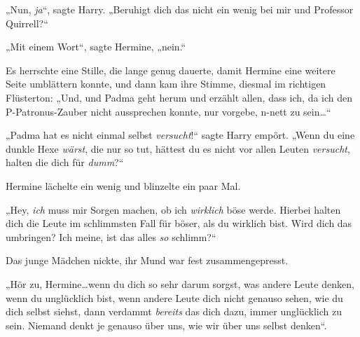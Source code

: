 „Nun, \emph{ja}“, sagte Harry.
„Beruhigt dich das nicht ein wenig bei mir und Professor Quirrell?“

„Mit einem Wort“, sagte Hermine, „nein.“

Es herrschte eine Stille, die lange genug dauerte, damit Hermine eine weitere Seite umblättern konnte, und dann kam ihre Stimme, diesmal im richtigen Flüsterton:
„Und, und Padma geht herum und erzählt allen, dass ich, da ich den P-Patronus-Zauber nicht aussprechen konnte, nur vorgebe, n-nett zu sein…“

„Padma hat es nicht einmal selbst \emph{versucht}!“ sagte Harry empört.
„Wenn du eine dunkle Hexe \emph{wärst}, die nur so tut, hättest du es nicht vor allen Leuten \emph{versucht}, halten die dich für \emph{dumm}?“

Hermine lächelte ein wenig und blinzelte ein paar Mal.

„Hey, \emph{ich} muss mir Sorgen machen, ob ich \emph{wirklich} böse werde. Hierbei halten dich die Leute im schlimmsten Fall für böser, als du wirklich bist. Wird dich das umbringen? Ich meine, ist das alles \emph{so} schlimm?“

Das junge Mädchen nickte, ihr Mund war fest zusammengepresst.

„Hör zu, Hermine…wenn du dich so sehr darum sorgst, was andere Leute denken, wenn du unglücklich bist, wenn andere Leute dich nicht genauso sehen, wie du dich selbst siehst, dann verdammt \emph{bereits} das dich dazu, immer unglücklich zu sein. Niemand denkt je genauso über uns, wie wir über uns selbst denken“.

